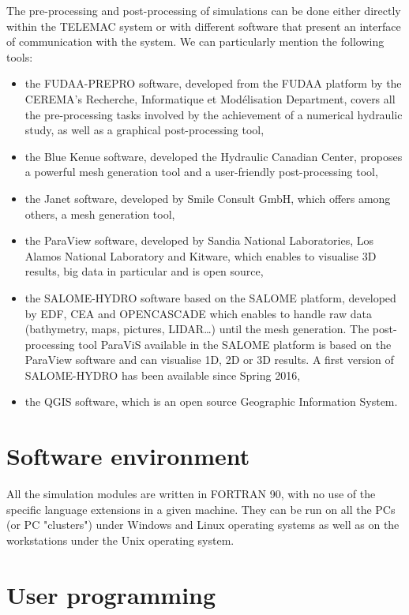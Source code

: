 The pre-processing and post-processing of simulations can be done either
directly within the TELEMAC system or with different software that present an
interface of communication with the system. We can particularly mention the
following tools:

\begin{itemize}
\item the FUDAA-PREPRO software, developed from the FUDAA platform
by the CEREMA's Recherche, Informatique et Modélisation Department, covers all
the pre-processing tasks involved by the achievement of a numerical hydraulic
study, as well as a graphical post-processing tool,
\item the Blue Kenue software, developed the Hydraulic Canadian
Center, proposes a powerful mesh generation tool and a user-friendly
post-processing tool,
\item the Janet software, developed by Smile Consult GmbH, which offers among
others, a mesh generation tool,
\item the ParaView software, developed by Sandia National Laboratories, Los
Alamos National Laboratory and Kitware, which enables to visualise 3D results,
big data in particular and is open source,
\item the SALOME-HYDRO software based on the SALOME platform, developed by EDF,
CEA and OPENCASCADE which enables to handle raw data (bathymetry, maps,
pictures, LIDAR\ldots) until the mesh generation.
The post-processing tool ParaViS available in the SALOME platform is based on
the ParaView software and can visualise 1D, 2D or 3D results.
A first version of SALOME-HYDRO has been available since Spring 2016,
\item the QGIS software, which is an open source Geographic Information System.
\end{itemize}


\section{Software environment}

All the simulation modules are written in FORTRAN 90, with no use of the
specific language extensions in a given machine. They can be run on all the PCs
(or PC "clusters") under Windows and Linux operating systems as well as on the
workstations under the Unix operating system.

\section{User programming}

